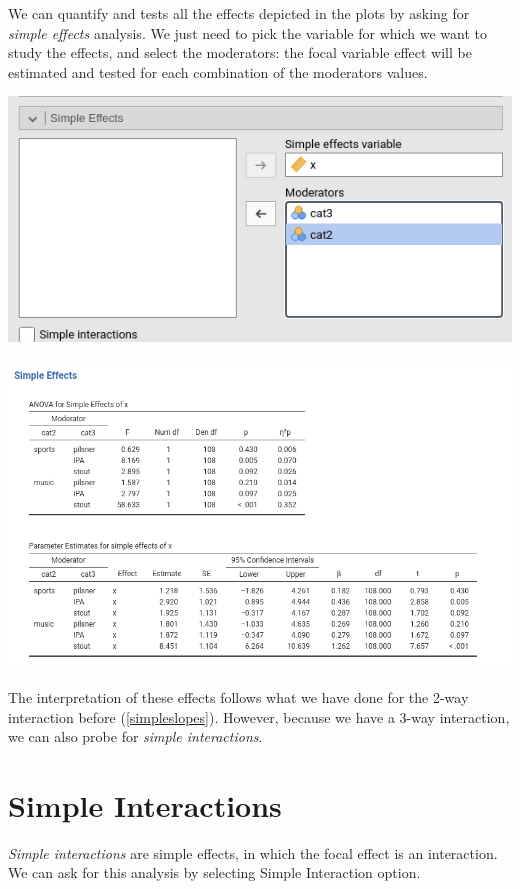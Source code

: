 \documentclass[
]{book}
\begin{document}
We can quantify and tests all the effects depicted in the plots by asking for \emph{simple effects} analysis. We just need to pick the variable for which we want to study the effects, and select the moderators: the focal variable effect will be estimated and tested for each combination of the moderators values.

\includegraphics[width=7.81in]{bookletpics/2_ancova_input5}

\includegraphics[width=11.36in]{bookletpics/2_ancova_output5}

The interpretation of these effects follows what we have done for the 2-way interaction before (\ref{simpleslopes}). However, because we have a 3-way interaction, we can also probe for \emph{simple interactions}.

\hypertarget{simpleinteractions}{%
\section{Simple Interactions}\label{simpleinteractions}}

\emph{Simple interactions} are simple effects, in which the focal effect is an interaction. We can ask for this analysis by selecting {Simple Interaction} option.
\end{document}
